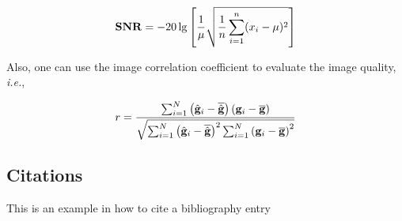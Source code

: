 \begin{equation}\label{eq:snr}
  \snr
\end{equation}

Also, one can use the image correlation coefficient to evaluate the image quality, \emph{i.e.},


\begin{equation}\label{eq:corr}
  \corrcoe
\end{equation}

\subsection{Citations}

This is an example in how to cite a bibliography entry \cite{cao2018} \\

